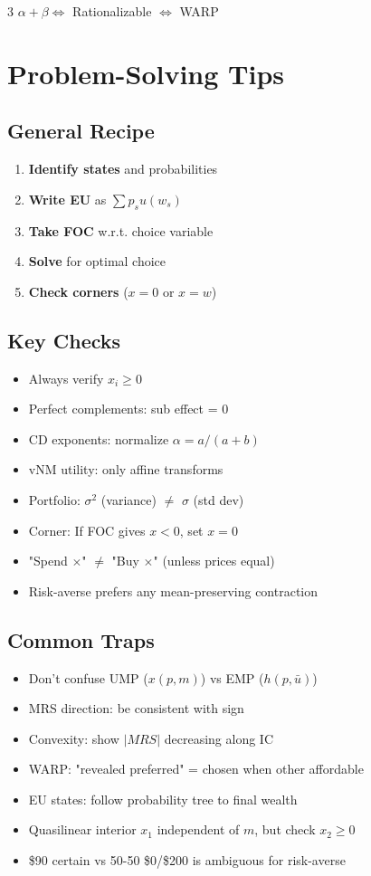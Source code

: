 \documentclass[10pt,landscape]{article}
\begin{document}
\begin{multicols}{3}
$\alpha + \beta \Leftrightarrow$ Rationalizable $\Leftrightarrow$ WARP

\section{Problem-Solving Tips}

\subsection{General Recipe}
\begin{enumerate}[leftmargin=*,noitemsep]
\item \textbf{Identify states} and probabilities
\item \textbf{Write EU} as $\sum p_s u(w_s)$
\item \textbf{Take FOC} w.r.t. choice variable
\item \textbf{Solve} for optimal choice
\item \textbf{Check corners} ($x = 0$ or $x = w$)
\end{enumerate}

\subsection{Key Checks}
\begin{itemize}[leftmargin=*,noitemsep]
\item Always verify $x_i \geq 0$
\item Perfect complements: sub effect = 0
\item CD exponents: normalize $\alpha = a/(a+b)$
\item vNM utility: only affine transforms
\item Portfolio: $\sigma^2$ (variance) $\neq$ $\sigma$ (std dev)
\item Corner: If FOC gives $x < 0$, set $x = 0$
\item "Spend $\times$" $\neq$ "Buy $\times$" (unless prices equal)
\item Risk-averse prefers any mean-preserving contraction
\end{itemize}

\subsection{Common Traps}
\begin{itemize}[leftmargin=*,noitemsep]
\item Don't confuse UMP ($x(p,m)$) vs EMP ($h(p,\bar{u})$)
\item MRS direction: be consistent with sign
\item Convexity: show $|MRS|$ decreasing along IC
\item WARP: "revealed preferred" = chosen when other affordable
\item EU states: follow probability tree to final wealth
\item Quasilinear interior $x_1$ independent of $m$, but check $x_2 \geq 0$
\item \$90 certain vs 50-50 \$0/\$200 is ambiguous for risk-averse
\end{itemize}

\end{multicols}
\end{document}
